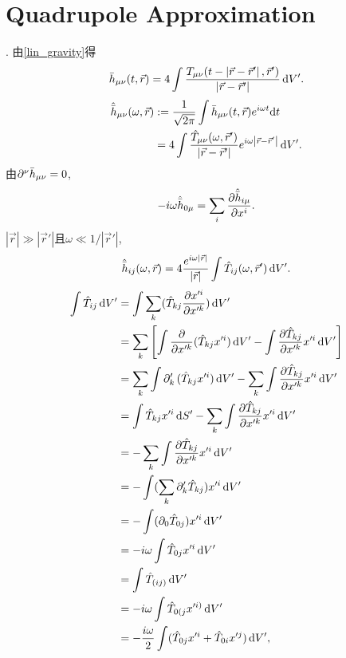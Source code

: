
\section{Quadrupole Approximation}

\cite{Wald1984}. 由\eqref{lin_gravity}得
\begin{equation}
    \bar{h}_{\mu\nu}(t,\vec{r}) = 4\int 
    \frac{T_{\mu\nu}(t-\left\lvert\vec{r}-\vec{r}'\right\rvert,\vec{r}')}{\left\lvert\vec{r}-\vec{r}'\right\rvert}\,\mathrm{d} V'.
\end{equation}
\begin{align}
    \hat{\bar{h}}_{\mu\nu}(\omega,\vec{r})&:=\frac{1}{\sqrt{2\pi}}
    \int\bar{h}_{\mu\nu}(t,\vec{r})e^{i\omega t}\mathrm{d} t\\
    &=4\int 
    \frac{\hat{T}_{\mu\nu}(\omega,\vec{r}')}{\left\lvert\vec{r}-\vec{r}'\right\rvert}e^{i\omega\left\lvert\vec{r}-\vec{r}'\right\rvert}\,\mathrm{d} V'.
\end{align}
由$\partial^{\nu}\bar{h}_{\mu\nu}=0$,
\begin{equation}
    -i\omega\hat{\bar{h}}_{0\mu}=\sum_{i}\frac{\partial\hat{\bar{h}}_{i\mu}}{\partial x^{i}}.
\end{equation}
$\left\lvert \vec{r}\right\rvert \gg \left\lvert \vec{r}'\right\rvert$且$\omega\ll1/\left\lvert \vec{r}'\right\rvert$,
\begin{equation}
    \hat{\bar{h}}_{ij}(\omega,\vec{r}) = 4
    \frac{e^{i\omega\left\lvert\vec{r}\right\rvert}}{\left\lvert\vec{r}\right\rvert}
    \int \hat{T}_{ij}(\omega,\vec{r}')\,\mathrm{d} V'.
\end{equation}
\begin{align}
    \int \hat{T}_{ij}\,\mathrm{d} V'
    &=\int \sum_{k}(\hat{T}_{kj}\frac{\partial x'^i}{\partial x'^k})\,\mathrm{d} V'\\
    &= \sum_{k}\left[\int \frac{\partial }{\partial x'^k}(\hat{T}_{kj}x'^i)\,\mathrm{d} V'-\int \frac{\partial \hat{T}_{kj}}{\partial x'^k}x'^i\,\mathrm{d} V'\right]\\
    &= \sum_{k}\int \partial'_k\,(\hat{T}_{kj}x'^i)\,\mathrm{d} V' - \sum_{k}\int \frac{\partial \hat{T}_{kj}}{\partial x'^k}x'^i\,\mathrm{d} V'\\
    &= \int \hat{T}_{kj}x'^i\,\mathrm{d} S' - \sum_{k}\int \frac{\partial \hat{T}_{kj}}{\partial x'^k}x'^i\,\mathrm{d} V'\\
    &= -\sum_{k}\int \frac{\partial \hat{T}_{kj}}{\partial x'^k}x'^i\,\mathrm{d} V'\\
    &= -\int (\sum_{k}\partial'_k\hat{T}_{kj})x'^i\,\mathrm{d} V'\\
    &= -\int (\partial_0\hat{T}_{0j})x'^i\,\mathrm{d} V'\\
    &= -i\omega\int \hat{T}_{0j}x'^i\,\mathrm{d} V'\\
    &= \int \hat{T}_{(ij)}\,\mathrm{d} V'\\
    &= -i\omega\int \hat{T}_{0(j}x'^{i)}\,\mathrm{d} V'\\
    &= -\frac{i\omega}{2}\int (\hat{T}_{0j}x'^{i}+\hat{T}_{0i}x'^{j})\,\mathrm{d} V',
\end{align}
